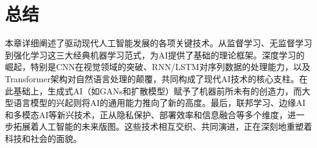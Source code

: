 \section{总结}
\label{sec:conclusion_chap2}
本章详细阐述了驱动现代人工智能发展的各项关键技术。从监督学习、无监督学习到强化学习这三大经典机器学习范式，为AI提供了基础的理论框架。深度学习的崛起，特别是CNN在视觉领域的突破、RNN/LSTM对序列数据的处理能力，以及Transformer架构对自然语言处理的颠覆，共同构成了现代AI技术的核心支柱。在此基础上，生成式AI（如GANs和扩散模型）赋予了机器前所未有的创造力，而大型语言模型的兴起则将AI的通用能力推向了新的高度。最后，联邦学习、边缘AI和多模态AI等新兴技术，正从隐私保护、部署效率和信息融合等多个维度，进一步拓展着人工智能的未来版图。这些技术相互交织、共同演进，正在深刻地重塑着科技和社会的面貌。